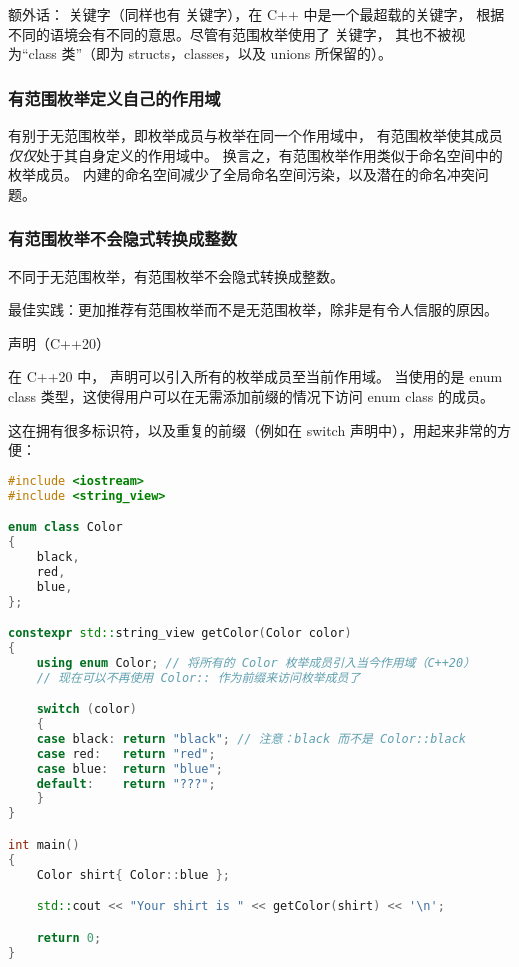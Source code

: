 \documentclass[../../LearnCpp.tex]{subfiles}
\begin{document}
额外话： 关键字（同样也有  关键字），在 C++ 中是一个最超载的关键字，
根据不同的语境会有不同的意思。尽管有范围枚举使用了  关键字，
其也不被视为“class 类”（即为 structs，classes，以及 unions 所保留的）。

\subsubsection*{有范围枚举定义自己的作用域}

有别于无范围枚举，即枚举成员与枚举在同一个作用域中，
有范围枚举使其成员\textit{仅仅}处于其自身定义的作用域中。
换言之，有范围枚举作用类似于命名空间中的枚举成员。
内建的命名空间减少了全局命名空间污染，以及潜在的命名冲突问题。

\subsubsection*{有范围枚举不会隐式转换成整数}

不同于无范围枚举，有范围枚举不会隐式转换成整数。

最佳实践：更加推荐有范围枚举而不是无范围枚举，除非是有令人信服的原因。

 声明（C++20）

在 C++20 中， 声明可以引入所有的枚举成员至当前作用域。
当使用的是 enum class 类型，这使得用户可以在无需添加前缀的情况下访问 enum class 的成员。

这在拥有很多标识符，以及重复的前缀（例如在 switch 声明中），用起来非常的方便：

\begin{lstlisting}[language=C++]
#include <iostream>
#include <string_view>

enum class Color
{
    black,
    red,
    blue,
};

constexpr std::string_view getColor(Color color)
{
    using enum Color; // 将所有的 Color 枚举成员引入当今作用域（C++20）
    // 现在可以不再使用 Color:: 作为前缀来访问枚举成员了

    switch (color)
    {
    case black: return "black"; // 注意：black 而不是 Color::black
    case red:   return "red";
    case blue:  return "blue";
    default:    return "???";
    }
}

int main()
{
    Color shirt{ Color::blue };

    std::cout << "Your shirt is " << getColor(shirt) << '\n';

    return 0;
}
\end{lstlisting}
\end{document}
